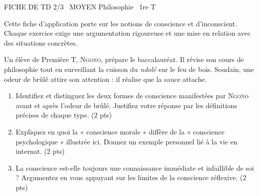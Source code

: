 \documentclass[11pt]{article}
\begin{document}
\begin{tcolorbox}[enhanced,colback=popink,colframe=popink,arc=10pt,boxrule=0pt,left=12pt,right=12pt,top=9pt,bottom=9pt]
{\color{white}\popxbold\small FICHE DE TD 2/3 \textbullet\ MOYEN \hfill Philosophie \textbullet\ 1re T\par}
\end{tcolorbox}
\vspace{4pt}
\noindent Cette fiche d'application porte sur les notions de conscience et d'inconscient. Chaque exercice exige une argumentation rigoureuse et une mise en relation avec des situations concrètes.

\begin{exercice}
Un élève de Première T, \textsc{Ngono}, prépare le baccalauréat. Il révise son cours de philosophie tout en surveillant la cuisson du \textit{ndolé} sur le feu de bois. Soudain, une odeur de brûlé attire son attention : il réalise que la sauce attache.
\begin{enumerate}
    \item Identifiez et distinguez les deux formes de conscience manifestées par \textsc{Ngono} avant et après l'odeur de brûlé. Justifiez votre réponse par les définitions précises de chaque type. (2 pts)
    \item Expliquez en quoi la « conscience morale » diffère de la « conscience psychologique » illustrée ici. Donnez un exemple personnel lié à la vie en internat. (2 pts)
    \item La conscience est-elle toujours une connaissance immédiate et infaillible de soi ? Argumentez en vous appuyant sur les limites de la conscience réflexive. (2 pts)
\end{enumerate}
\end{exercice}
\end{document}
